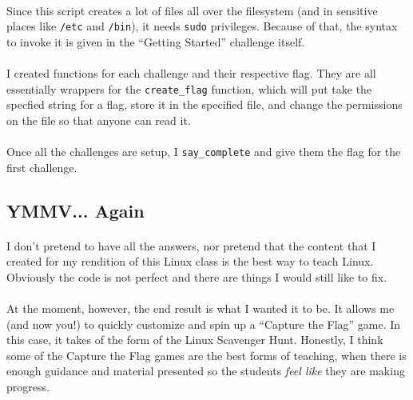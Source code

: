 \documentclass[11pt]{article}
\begin{document}
	\paragraph{} Since this script creates a lot of files all over the filesystem (and in sensitive places like \texttt{/etc} and \texttt{/bin}), it needs \texttt{sudo} privileges. Because of that, the syntax to invoke it is given in the ``Getting Started'' challenge itself.

	\paragraph{} I created functions for each challenge and their respective flag. They are all essentially wrappers for the \texttt{create\_flag} function, which will put take the specfied string for a flag, store it in the specified file, and change the permissions on the file so that anyone can read it.

	\paragraph{} Once all the challenges are setup, I \texttt{say\_complete} and give them the flag for the first challenge. 

	\subsection{YMMV... Again}

	\paragraph{} I don't pretend to have all the answers, nor pretend that the content that I created for my rendition of this Linux class is the best way to teach Linux. Obviously the code is not perfect and there are things I would still like to fix.

	\paragraph{} At the moment, however, the end result is what I wanted it to be. It allows me (and now you!) to quickly customize and spin up a ``Capture the Flag'' game. In this case, it takes of the form of the Linux Scavenger Hunt. Honestly, I think some of the Capture the Flag games are the best forms of teaching, when there is enough guidance and material presented so the students \textit{feel like} they are making progress.
\end{document}
